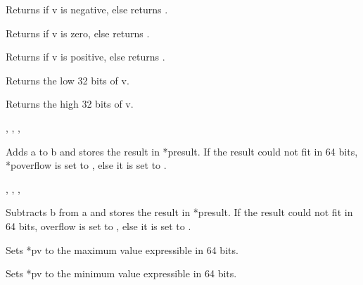 Returns  if v is negative, else returns
.
\cendmacrodescription


\cendmacrodecl

Returns  if v is zero,
else returns .
\cendmacrodescription


\cendmacrodecl

Returns  if v is positive, else returns
.
\cendmacrodescription


\cendmacrodecl

Returns the low 32 bits of v.
\cendmacrodescription


\cendmacrodecl

Returns the high 32 bits of v.
\cendmacrodescription


,
,
,
\cendmacrodecl

Adds a to b and stores the result in *presult.
If the result could not fit in 64 bits, *poverflow is set to
, else it is set to .
\cendmacrodescription


,
,
,
\cendmacrodecl

Subtracts b from a and stores the result in
*presult.
If the result could not fit in 64 bits, overflow is set to
, else it is set to .
\cendmacrodescription


\cendmacrodecl

Sets *pv to the maximum value expressible in 64 bits.
\cendmacrodescription


\cendmacrodecl

Sets *pv to the minimum value expressible in 64 bits.
\cendmacrodescription

